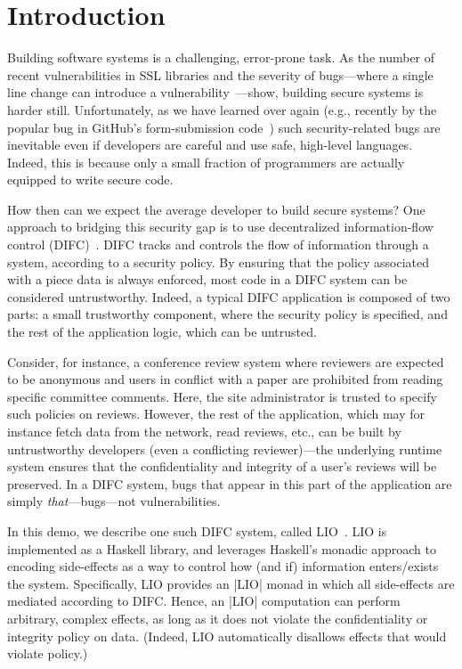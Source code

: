 \section{Introduction}
\label{sec:intro}

Building software systems is a challenging, error-prone task.
%
As the number of recent vulnerabilities in SSL libraries and the
severity of bugs---where a single line change can introduce a
vulnerability~\cite{goto}---show, building secure systems is harder
still.
%
Unfortunately, as we have learned over again (e.g., recently by the
popular bug in GitHub's form-submission code~\cite{gitfail}) such
security-related bugs are inevitable even if developers are careful
and use safe, high-level languages.
%
Indeed, this is because only a small fraction of programmers are
actually equipped to write secure code.
%


How then can we expect the average developer to build secure systems?
%
One approach to bridging this security gap is to use decentralized
information-flow control (DIFC)~\cite{myers:dlm,
sabelfeld:language-based-iflow}.
%
DIFC tracks and controls the flow of information through a system,
according to a security policy.
%
By ensuring that the policy associated with a piece data is always
enforced, most code in a DIFC system can be considered untrustworthy.
%
Indeed, a typical DIFC application is composed of two parts: a small
trustworthy component, where the security policy is specified, and the
rest of the application logic, which can be untrusted.
%

%
Consider, for instance, a conference review system where reviewers are
expected to be anonymous and users in conflict with a paper are
prohibited from reading specific committee comments.
%
Here, the site administrator is trusted to specify such policies on
reviews. 
%
However, the rest of the application, which may for instance fetch
data from the network, read reviews, etc., can be built by
untrustworthy developers (even a conflicting reviewer)---the
underlying runtime system ensures that the confidentiality and
integrity of a user's reviews will be preserved.
%
In a DIFC system, bugs that appear in this part of the application
are simply \emph{that}---bugs---not vulnerabilities.

In this demo, we describe one such DIFC system, called
LIO~\cite{lio, concurrent-lio}.
%
LIO is implemented as a Haskell library, and leverages Haskell's
monadic approach to encoding side-effects as a way to control how (and
if) information enters/exists the system.
%
Specifically, LIO provides an \hs|LIO| monad in which
all side-effects are mediated according to DIFC.
%
Hence, an \hs|LIO| computation can perform arbitrary, complex effects,
as long as it does not violate the confidentiality or integrity
policy on data.
%
(Indeed, LIO automatically disallows effects that would violate policy.)
